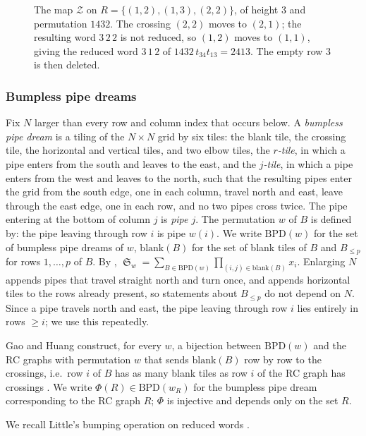 \documentclass{amsart}
\theoremstyle{definition}
\theoremstyle{remark}
\numberwithin{equation}{subsection}
\DeclareMathOperator{\sch}{\mathfrak{S}}
\newcommand{\wof}[1]{w_{#1}}
\newcommand{\zeromap}{\mathcal{Z}}
\begin{document}
\begin{figure}[htbp]
\caption{The map $\zeromap$ on $R=\{(1,2),(1,3),(2,2)\}$, of height $3$ and permutation $1432$. The crossing $(2,2)$ moves to $(2,1)$; the resulting word $3\,2\,2$ is not reduced, so $(1,2)$ moves to $(1,1)$, giving the reduced word $3\,1\,2$ of $1432\,t_{34}t_{13}=2413$. The empty row $3$ is then deleted.}
\label{fig:zeroing}
\end{figure}




\subsubsection*{Bumpless pipe dreams}
Fix $N$ larger than every row and column index that occurs below. A \emph{bumpless pipe dream} \cite{lam2021back} is a tiling of the $N\times N$ grid by six tiles: the blank tile, the crossing tile, the horizontal and vertical tiles, and two elbow tiles, the \emph{$r$-tile}, in which a pipe enters from the south and leaves to the east, and the \emph{$j$-tile}, in which a pipe enters from the west and leaves to the north, such that the resulting pipes enter the grid from the south edge, one in each column, travel north and east, leave through the east edge, one in each row, and no two pipes cross twice. The pipe entering at the bottom of column $j$ is \emph{pipe $j$}. The permutation $w$ of $B$ is defined by: the pipe leaving through row $i$ is pipe $w(i)$. We write $\mathrm{BPD}(w)$ for the set of bumpless pipe dreams of $w$, $\mathrm{blank}(B)$ for the set of blank tiles of $B$ and $B_{\leq p}$ for rows $1,\ldots,p$ of $B$. By \cite[Theorem~5.13]{lam2021back}, $\sch_w=\sum_{B\in\mathrm{BPD}(w)}\prod_{(i,j)\in\mathrm{blank}(B)}x_i$. Enlarging $N$ appends pipes that travel straight north and turn once, and appends horizontal tiles to the rows already present, so statements about $B_{\leq p}$ do not depend on $N$. Since a pipe travels north and east, the pipe leaving through row $i$ lies entirely in rows $\geq i$; we use this repeatedly.

Gao and Huang \cite{GaoHuang2023} construct, for every $w$, a bijection between $\mathrm{BPD}(w)$ and the RC graphs with permutation $w$ that sends $\mathrm{blank}(B)$ row by row to the crossings, i.e.\ row $i$ of $B$ has as many blank tiles as row $i$ of the RC graph has crossings \cite[Theorem~3.6]{GaoHuang2023}. We write $\Phi(R)\in\mathrm{BPD}(\wof R)$ for the bumpless pipe dream corresponding to the RC graph $R$; $\Phi$ is injective and depends only on the set $R$.

We recall Little's bumping operation on reduced words \cite{little2003combinatorial}.
\end{document}
